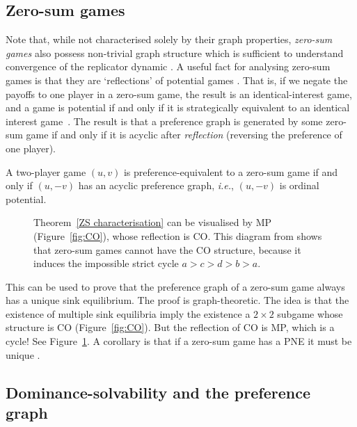 \documentclass[preprint,authoryear]{elsarticle}
\begin{document}
\subsection{Zero-sum games} \label{sec: zero-sum}
Note that, while not characterised solely by their graph properties, \emph{zero-sum games} \citep{von2007theory} also possess non-trivial graph structure which is sufficient to understand convergence of the replicator dynamic \citep{biggar_attractor_2024}. A useful fact for analysing zero-sum games is that they are `reflections' of potential games \citep{candogan_flows_2011,hwang_strategic_2020}. That is, if we negate the payoffs to one player in a zero-sum game, the result is an identical-interest game, and a game is potential if and only if it is strategically equivalent to an identical interest game~\citep{monderer_fictitious_1996,monderer_potential_1996}. The result is that a preference graph is generated by some zero-sum game if and only if it is acyclic after \emph{reflection} (reversing the preference of one player).
\begin{thm} \label{ZS characterisation}
    A two-player game $(u,v)$ is preference-equivalent to a zero-sum game if and only if $(u,-v)$ has an acyclic preference graph, \emph{i.e.}, $(u,-v)$ is ordinal potential.
\end{thm}
\begin{figure}
    \centering
    
    \caption{Theorem~\ref{ZS characterisation} can be visualised by MP (Figure~\ref{fig:CO}), whose reflection is CO. This diagram from \cite{biggar_graph_2023} shows that zero-sum games cannot have the CO structure, because it induces the impossible strict cycle $a>c>d>b>a$.}
    \label{fig:no CO}
\end{figure}
This can be used to prove that the preference graph of a zero-sum game always has a unique sink equilibrium. The proof is graph-theoretic. The idea is that the existence of multiple sink equilibria imply the existence a $2\times 2$ subgame whose structure is CO (Figure~\ref{fig:CO}). But the reflection of CO is MP, which is a cycle! See Figure~\ref{fig:no CO}. A corollary is that if a zero-sum game has a PNE it must be unique \citep{biggar_graph_2023}.



\subsection{Dominance-solvability and the preference graph} \label{sec:dominance}
\end{document}

